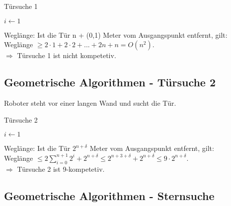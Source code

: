 \begin{algorithm}[H]
	\caption{Türsuche 1}


	$i \leftarrow 1$
	
\end{algorithm}

Weglänge: Ist die Tür n + (0,1) Meter vom Ausgangspunkt entfernt, gilt:\\
Weglänge $\ge 2 \cdot 1 + 2 \cdot 2 + ... + 2n +n = O(n^2)$.\\
$\Rightarrow$ Türsuche 1 ist nicht kompetetiv.


\subsection{Geometrische Algorithmen - Türsuche 2}

Roboter steht vor einer langen Wand und sucht die Tür.\\


\begin{algorithm}[H]
	\caption{Türsuche 2}


	$i \leftarrow 1$
	
\end{algorithm}

Weglänge: Ist die Tür $2^{n+\delta}$ Meter vom Ausgangspunkt entfernt, gilt:\\
Weglänge $\le 2 \sum\limits_{i=0}^{n+1} 2^i + 2^{n+\delta} \le 2 ^{n+3+\delta} + 2^{n+\delta} \le 9 \cdot 2^{n+\delta}$.\\
$\Rightarrow$ Türsuche 2 ist 9-kompetetiv.


\subsection{Geometrische Algorithmen - Sternsuche}

